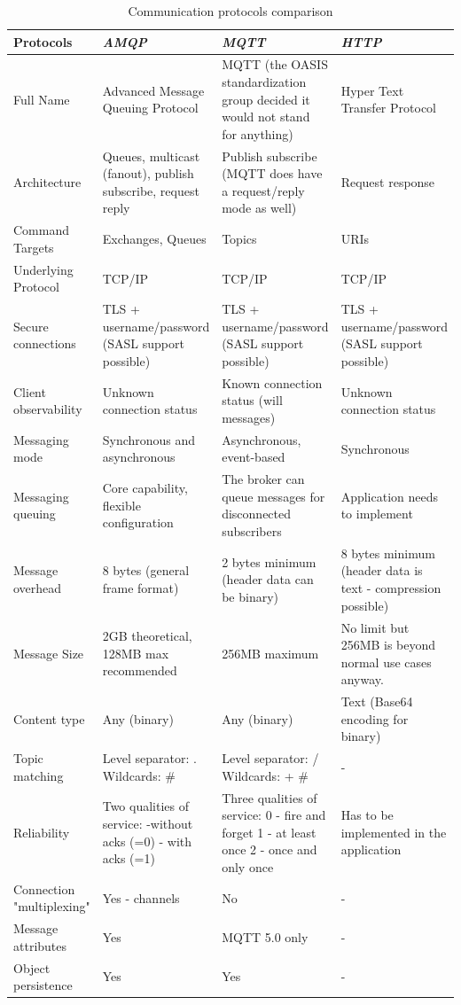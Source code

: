 \newpage
\begin{table}
    \caption{Communication protocols comparison}
    \begin{center}
    \renewcommand{\arraystretch}{2}
    \begin{tabular}{|p{3cm}|p{4.5cm}|p{4.5cm}|p{4.5cm}|}
    \hline
    \textbf{{Protocols}}& \textbf{\textit{AMQP}}& \textbf{\textit{MQTT}}& \textbf{\textit{HTTP}} \\
    \hline
    Full Name & Advanced Message Queuing Protocol & MQTT (the OASIS standardization group decided it would not stand for anything) & Hyper Text Transfer Protocol\\
    \hline
    Architecture & Queues, multicast (fanout), publish subscribe, request reply & Publish subscribe (MQTT does have a request/reply mode as well) & Request response\\
    \hline
    Command Targets & Exchanges, Queues & Topics & URIs\\
    \hline
    Underlying Protocol & TCP/IP & TCP/IP & TCP/IP\\
    \hline
    Secure connections & TLS + username/password (SASL support possible) & TLS + username/password (SASL support possible) & TLS + username/password (SASL support possible)\\
    \hline
    Client observability & Unknown connection status & Known connection status (will messages) & Unknown connection status\\
    \hline
    Messaging mode & Synchronous and asynchronous & Asynchronous, event-based & Synchronous\\
    \hline
    Messaging queuing & Core capability, flexible configuration & The broker can queue messages for disconnected subscribers & Application needs to implement\\
    \hline
    Message overhead & 8 bytes (general frame format) & 2 bytes minimum (header data can be binary) & 8 bytes minimum (header data is text - compression possible)\\
    \hline
    Message Size & 2GB theoretical, 128MB max recommended & 256MB maximum & No limit but 256MB is beyond normal use cases anyway.\\
    \hline
    Content type & Any (binary) & Any (binary) & Text (Base64 encoding for binary)\\
    \hline
    Topic matching & Level separator: . Wildcards: \* \# & Level separator: / Wildcards: + \# & - \\
    \hline
    Reliability & Two qualities of service: -without acks (=0) - with acks (=1) & Three qualities of service: 0 - fire and forget 1 - at least once 2 - once and only once & Has to be implemented in the application\\
    \hline
    Connection "multiplexing" & Yes - channels & No & -\\
    \hline
    Message attributes & Yes & MQTT 5.0 only & -\\
    \hline
    Object persistence & Yes & Yes & -\\
    \hline
    \end{tabular}
    \label{tab-1}
    \end{center}
    \end{table}
